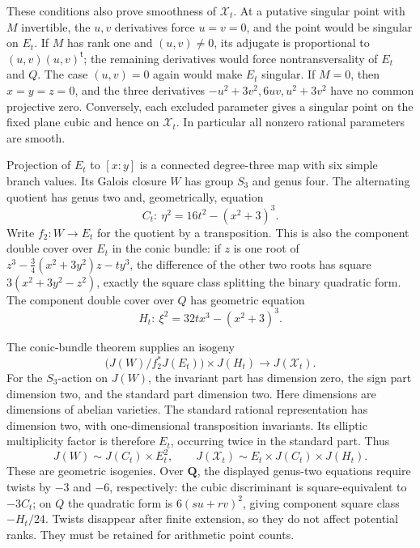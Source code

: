 \documentclass[11pt]{article}
\theoremstyle{remark}
\begin{document}
These conditions also prove smoothness of \(\mathcal X_t\). At a putative
singular point with \(M\) invertible, the \(u,v\) derivatives force
\(u=v=0\), and the point would be singular on \(E_t\). If \(M\) has
rank one and \((u,v)\ne0\), its adjugate is proportional to
\((u,v)(u,v)^{\mathsf t}\); the remaining derivatives would force
nontransversality of \(E_t\) and \(Q\). The case \((u,v)=0\) again
would make \(E_t\) singular. If \(M=0\), then \(x=y=z=0\), and the
three derivatives \(-u^2+3v^2,6uv,u^2+3v^2\) have no common projective
zero. Conversely, each excluded parameter gives a singular point on the
fixed plane cubic and hence on \(\mathcal X_t\). In particular all
nonzero rational parameters are smooth.

Projection of \(E_t\) to \([x:y]\) is a connected degree-three map with
six simple branch values. Its Galois closure \(W\) has group \(S_3\)
and genus four. The alternating quotient has genus two and, geometrically,
equation
\begin{equation}
 C_t:\ \eta^2=16t^2-(x^2+3)^3.
 \label{eq:pencil-genus-two-C}
\end{equation}
Write \(f_2:W\to E_t\) for the quotient by a transposition.
This is also the component double cover over \(E_t\) in the conic bundle:
if \(z\) is one root of
\(z^3-\tfrac34(x^2+3y^2)z-ty^3\), the difference of the other two roots
has square \(3(x^2+3y^2-z^2)\), exactly the square class splitting the
binary quadratic form. The component double cover over \(Q\) has
geometric equation
\begin{equation}
 H_t:\ \xi^2=32tx^3-(x^2+3)^3.
 \label{eq:pencil-genus-two-H}
\end{equation}

The conic-bundle theorem \cite[Theorem~2.9]{CMZ} supplies an isogeny
\[
 \bigl(J(W)/f_2^*J(E_t)\bigr)\times J(H_t)\longrightarrow J(\mathcal X_t).
\]
For the \(S_3\)-action on \(J(W)\), the invariant part has dimension
zero, the sign part dimension two, and the standard part dimension two.
Here dimensions are dimensions of abelian varieties. The standard rational
representation has dimension two, with one-dimensional transposition
invariants. Its elliptic multiplicity factor is therefore \(E_t\), occurring
twice in the standard part. Thus
\begin{equation}
 J(W)\sim J(C_t)\times E_t^2,\qquad
 J(\mathcal X_t)\sim E_t\times J(C_t)\times J(H_t).
 \label{eq:pencil-prym-isogeny}
\end{equation}
These are geometric isogenies. Over \(\mathbf Q\), the displayed
genus-two equations require twists by \(-3\) and \(-6\), respectively:
the cubic discriminant is square-equivalent to \(-3C_t\); on \(Q\) the
quadratic form is \(6(su+rv)^2\), giving component square class
\(-H_t/24\). Twists disappear after finite extension, so they do not
affect potential ranks. They must be retained for arithmetic point counts.
\end{document}
